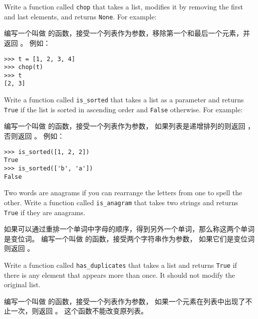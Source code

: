 \begin{exercise}

Write a function called \verb"chop" that takes a list, modifies it
by removing the first and last elements, and returns {\tt None}.
For example:

编写一个叫做  的函数，接受一个列表作为参数，移除第一个和最后一个元素，并返回 。
例如：

\begin{lstlisting}
>>> t = [1, 2, 3, 4]
>>> chop(t)
>>> t
[2, 3]
\end{lstlisting}

\end{exercise}


\begin{exercise}
Write a function called \verb"is_sorted" that takes a list as a
parameter and returns {\tt True} if the list is sorted in ascending
order and {\tt False} otherwise.  For example:

编写一个叫做  的函数，接受一个列表作为参数，
如果列表是递增排列的则返回  ，否则返回 。
例如：

\begin{lstlisting}
>>> is_sorted([1, 2, 2])
True
>>> is_sorted(['b', 'a'])
False
\end{lstlisting}

\end{exercise}


\begin{exercise}
\label{anagram}

Two words are anagrams if you can rearrange the letters from one
to spell the other.  Write a function called \verb"is_anagram"
that takes two strings and returns {\tt True} if they are anagrams.


如果可以通过重排一个单词中字母的顺序，得到另外一个单词，那么称这两个单词是变位词。
编写一个叫做  的函数，接受两个字符串作为参数，
如果它们是变位词则返回  。
\end{exercise}



\begin{exercise}
\label{duplicate}
  

Write a function called \verb"has_duplicates" that takes
a list and returns {\tt True} if there is any element that
appears more than once.  It should not modify the original
list.

编写一个叫做  的函数，接受一个列表作为参数，
如果一个元素在列表中出现了不止一次，则返回  。
这个函数不能改变原列表。

\end{exercise}


